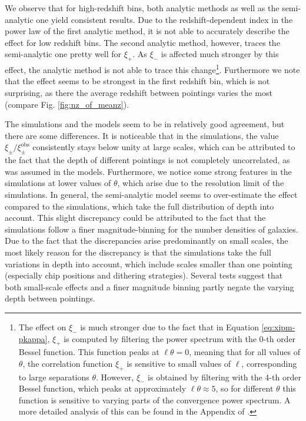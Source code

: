 \documentclass{aa}
\renewcommand{\rm}{\mathrm}
\begin{document}
We observe that for high-redshift bins, both analytic methods as well as the semi-analytic one yield consistent results. Due to the redshift-dependent index in the power law of the first analytic method, it is not able to accurately describe the effect for low redshift bins. The second analytic method, however, traces the semi-analytic one pretty well for $\xi_+$. As $\xi_-$ is affected much stronger by this effect, the analytic method is not able to trace this change\footnote{The effect on $\xi_-$ is much stronger due to the fact that in Equation \eqref{eq:xipm-pkappa}, $\xi_+$ is computed by filtering the power spectrum with the 0-th order Bessel function. This function peaks at $\ell\theta=0$, meaning that for all values of $\theta$, the correlation function $\xi_+$ is sensitive to small values of $\ell$, corresponding to large separations $\theta$. However, $\xi_-$ is obtained by filtering with the 4-th order Bessel function, which peaks at approximately $\ell\theta\approx 5$, so for different $\theta$ this function is sensitive to varying parts of the convergence power spectrum. A more detailed analysis of this can be found in the Appendix of \citet{2017MNRAS.471.4412K}.}. Furthermore we note that the effect seems to be strongest in the first redshift bin, which is not surprising, as there the average redshift between pointings varies the most (compare Fig. \ref{fig:nz_of_meanz}).

The simulations and the models seem to be in relatively good agreement, but there are some differences. It is noticeable that in the simulations, the value $\xi_\pm/\xi_\pm^{\rm{obs}}$ consistently stays below unity at large scales, which can be attributed to the fact that the depth of different pointings is not completely uncorrelated, as was assumed in the models. Furthermore, we notice some strong features in the simulations at lower values of $\theta$, which arise due to the resolution limit of the simulations.  %
In general, the semi-analytic model seems to over-estimate the effect compared to the simulations, which take the full distribution of depth into account. This slight discrepancy could be attributed to the fact that the simulations follow a finer magnitude-binning for the number densities of galaxies. Due to the fact that the discrepancies arise predominantly on small scales, the most likely reason for the discrepancy is that the simulations take the full variations in depth into account, which include scales smaller than one pointing (especially chip positions and dithering strategies). Several tests suggest that both small-scale effects and a finer magnitude binning partly negate the varying depth between pointings.
\end{document}
